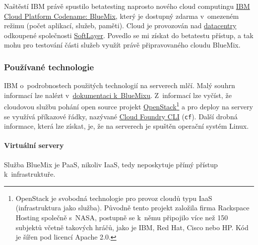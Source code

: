Naštěstí IBM právě spustilo betatesting naprosto nového cloud computingu \href{https://ace.ng.bluemix.net/}{IBM Cloud Platform Codename: BlueMix}\cite{bluemix:web}, který je dostupný zdarma v~omezeném režimu (počet aplikací, služeb, paměti). Cloud je provozován nad \href{https://www.softlayer.com/about/datacenters}{datacentry} odkoupené společnosti \href{https://www.softlayer.com/}{SoftLayer}. Povedlo se mi získat do betatestu přístup, a tak mohu pro testování části služeb využít právě připravovaného cloudu BlueMix.

\subsubsection{Používané technologie}
IBM o~podrobnostech použitých technologií na serverech mlčí. Malý souhrn informací lze nalézt v~\href{https://www.ng.bluemix.net/docs/DeepDive.html}{dokumentaci k~BlueMixu}. Z~informací lze vyčíst, že cloudovou službu pohání open source projekt \href{https://www.openstack.org/}{OpenStack}\footnote{OpenStack je svobodná technologie pro provoz cloudů typu IaaS (infrastruktura jako služba). Původně tento projekt založila firma Rackspace Hosting společně s~NASA, postupně se k~němu připojilo více než 150 subjektů včetně takových hráčů, jako je IBM, Red Hat, Cisco nebo HP. Kód je šířen pod licencí Apache 2.0.\cite{toposs:openStack}} a pro deploy na servery se využívá příkazové řádky, nazývané \href{https://github.com/cloudfoundry/cli}{Cloud Foundry CLI} (\texttt{cf}). Další drobná informace, která lze získat, je, že na serverech je spuštěn operační systém Linux.

\paragraph{Virtuální servery}
Služba BlueMix je PaaS, nikoliv IaaS, tedy neposkytuje přímý přístup k~infrastruktuře.

